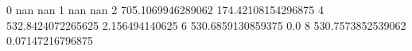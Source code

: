 0 nan nan
1 nan nan
2 705.1069946289062 174.42108154296875
4 532.8424072265625 2.156494140625
6 530.6859130859375 0.0
8 530.7573852539062 0.07147216796875
